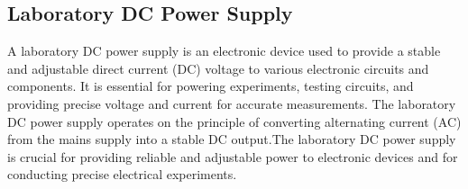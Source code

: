 \documentclass[a4paper,12pt]{article}
\begin{document}
\subsection{Laboratory DC Power Supply}
A laboratory DC power supply is an electronic device used to provide a stable and adjustable direct current (DC) voltage to various electronic circuits and components. It is essential for powering experiments, testing circuits, and providing precise voltage and current for accurate measurements.
The laboratory DC power supply operates on the principle of converting alternating current (AC) from the mains supply into a stable DC output.The laboratory DC power supply is crucial for providing reliable and adjustable power to electronic devices and for conducting precise electrical experiments.

			\begin{figure}[H]
		\centering
\end{figure}
\end{document}
